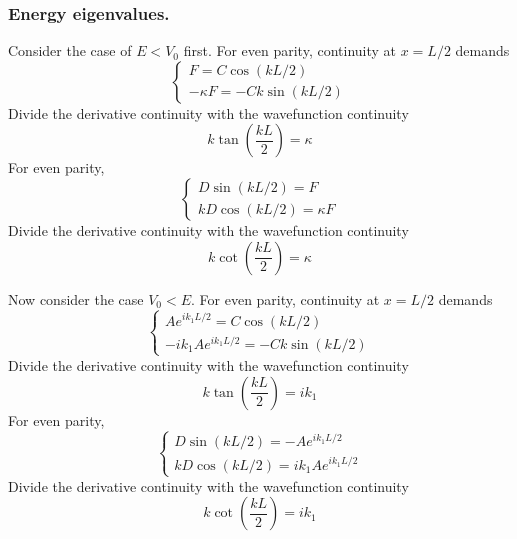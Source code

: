 \documentclass[../../../main.tex]{subfiles}
\begin{document}
\subsubsection{Energy eigenvalues.}
Consider the case of $E<V_0$ first.
For even parity, continuity at $x=L/2$ demands
\begin{equation*}
    \begin{cases}
        F=C \cos \left(  kL/2 \right) \\
        -\kappa F =-C k \sin  \left( kL/2\right)
    \end{cases}
\end{equation*}
Divide the derivative continuity with the wavefunction continuity
\begin{equation*}
    k \tan \left( \frac{k L}{2} \right) =\kappa
\end{equation*}
For even parity,
\begin{equation*}
    \begin{cases}
        D \sin (kL/2)=F \\
        kD \cos (kL/2)=\kappa F
    \end{cases}
\end{equation*}
Divide the derivative continuity with the wavefunction continuity
\begin{equation*}
    k \cot \left( \frac{k L}{2} \right) =\kappa
\end{equation*}

Now consider the case $V_0<E$.
For even parity, continuity at $x=L/2$ demands
\begin{equation*}
    \begin{cases}
        Ae^{ik_1L/2}=C \cos (kL/2) \\
        -ik_1 Ae^{ik_1L/2}=-C k \sin  \left( kL/2\right)
    \end{cases}
\end{equation*}
Divide the derivative continuity with the wavefunction continuity
\begin{equation*}
    k \tan \left( \frac{k L}{2} \right) =ik_1
\end{equation*}
For even parity,
\begin{equation*}
    \begin{cases}
        D \sin (kL/2)=-Ae^{ik_1L/2} \\
        kD \cos (kL/2)=ik_1Ae^{ik_1L/2} 
    \end{cases}
\end{equation*}
Divide the derivative continuity with the wavefunction continuity
\begin{equation*}
    k \cot \left( \frac{k L}{2} \right) =ik_1
\end{equation*}
\end{document}
